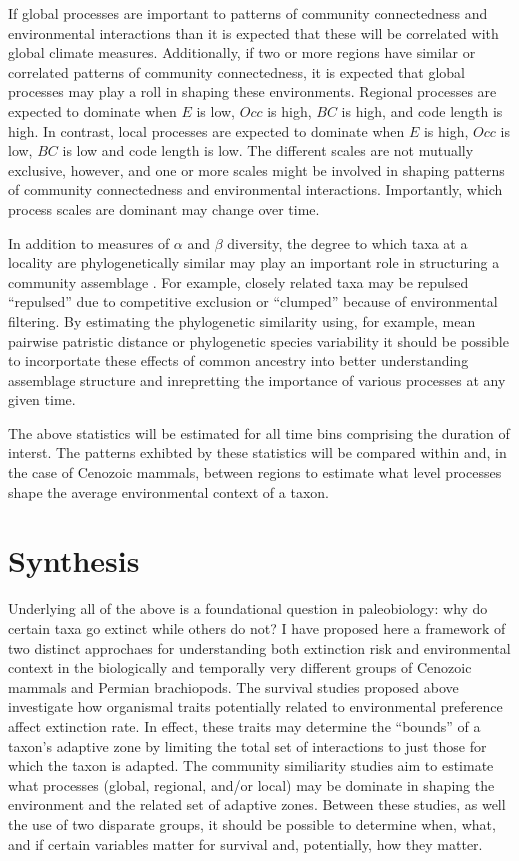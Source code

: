 \documentclass[12pt,letterpaper]{article}
\begin{document}
If global processes are important to patterns of community connectedness and environmental interactions than it is expected that these will be correlated with global climate measures. Additionally, if two or more regions have similar or correlated patterns of community connectedness, it is expected that global processes may play a roll in shaping these environments. Regional processes are expected to dominate when \(E\) is low, \(Occ\) is high, \(BC\) is high, and code length is high. In contrast, local processes are expected to dominate when \(E\) is high, \(Occ\) is low, \(BC\) is low and code length is low. The different scales are not mutually exclusive, however, and one or more scales might be involved in shaping patterns of community connectedness and environmental interactions. Importantly, which process scales are dominant may change over time.

In addition to measures of \(\alpha\) and \(\beta\) diversity, the degree to which taxa at a locality are phylogenetically similar may play an important role in structuring a community assemblage \citep{Webb2002}. For example, closely related taxa may be repulsed ``repulsed'' due to competitive exclusion or ``clumped'' because of environmental filtering. By estimating the phylogenetic similarity using, for example, mean pairwise patristic distance \citep{Webb2002} or phylogenetic species variability \citep{Helmus2007a} it should be possible to incorportate these effects of common ancestry into better understanding assemblage structure and inrepretting the importance of various processes at any given time.

The above statistics will be estimated for all time bins comprising the duration of interst. The patterns exhibted by these statistics will be compared within and, in the case of Cenozoic mammals, between regions to estimate what level processes shape the average environmental context of a taxon.


\section{Synthesis}
Underlying all of the above is a foundational question in paleobiology: why do certain taxa go extinct while others do not? I have proposed here a framework of two distinct approchaes for understanding both extinction risk and environmental context in the biologically and temporally very different groups of Cenozoic mammals and Permian brachiopods. The survival studies proposed above investigate how organismal traits potentially related to environmental preference affect extinction rate. In effect, these traits may determine the ``bounds'' of a taxon's adaptive zone by limiting the total set of interactions to just those for which the taxon is adapted. The community similiarity studies aim to estimate what processes (global, regional, and/or local) may be dominate in shaping the environment and the related set of adaptive zones. Between these studies, as well the use of two disparate groups, it should be possible to determine when, what, and if certain variables matter for survival and, potentially, how they matter. 
\end{document}
